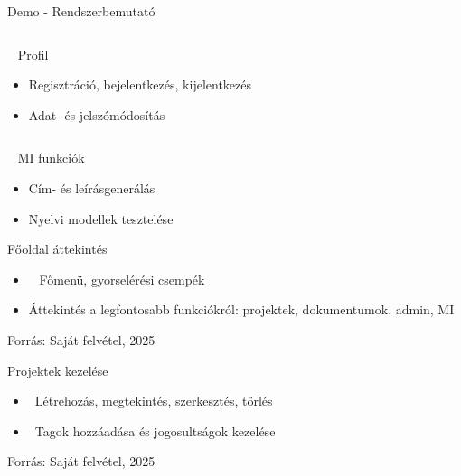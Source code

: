 \documentclass[11pt]{beamer}
\begin{document}
\begin{frame}{Demo - Rendszerbemutató}
\begin{columns}[T]
\begin{column}{0.5\textwidth}
      \begin{block}{\faUserCircle~ Profil}
        \begin{itemize}
          \item Regisztráció, bejelentkezés, kijelentkezés
          \item Adat- és jelszómódosítás
        \end{itemize}
      \end{block}
    \end{column}
  \end{columns}
\vspace{-0.5em}
  \begin{center}
      \begin{minipage}{0.5\textwidth}
        \begin{block}{\faRobot~ MI funkciók}
          \begin{itemize}
            \item Cím- és leírásgenerálás
            \item Nyelvi modellek tesztelése
          \end{itemize}
        \end{block}
      \end{minipage}
    \end{center}
\end{frame}

\begin{frame}{Főoldal áttekintés}
  \begin{center}
  \end{center}
  \begin{itemize}
    \item \faHome~ Főmenü, gyorselérési csempék
    \item Áttekintés a legfontosabb funkciókról: projektek, dokumentumok, admin, MI
  \end{itemize}
  \begin{center}
    \scriptsize Forrás: Saját felvétel, 2025
  \end{center}
\end{frame}


\begin{frame}{Projektek kezelése}
    \begin{center}
    \end{center}
    \begin{itemize}
      \item \faPlusCircle~Létrehozás, megtekintés, szerkesztés, törlés
      \item \faUsers~Tagok hozzáadása és jogosultságok kezelése
    \end{itemize}
    \begin{center}
        \scriptsize Forrás: Saját felvétel, 2025
    \end{center}
\end{frame}
\end{document}
